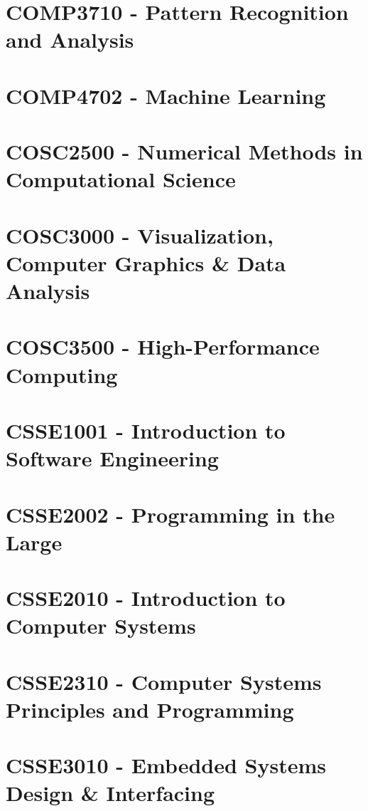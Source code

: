 \documentclass[a4paper,12pt]{report}
\begin{document}
\hypertarget{COMP3710}{\section{COMP3710 - Pattern Recognition and Analysis}}

\hypertarget{COMP4702}{\section{COMP4702 - Machine Learning}}

\hypertarget{COSC2500}{\section{COSC2500 - Numerical Methods in Computational Science}}

\hypertarget{COSC3000}{\section{COSC3000 - Visualization, Computer Graphics \& Data Analysis}}

\hypertarget{COSC3500}{\section{COSC3500 - High-Performance Computing}}

\hypertarget{CSSE1001}{\section{CSSE1001 - Introduction to Software Engineering}}

\hypertarget{CSSE2002}{\section{CSSE2002 - Programming in the Large}}

\hypertarget{CSSE2010}{\section{CSSE2010 - Introduction to Computer Systems}}

\hypertarget{CSSE2310}{\section{CSSE2310 - Computer Systems Principles and Programming}}

\hypertarget{CSSE3010}{\section{CSSE3010 - Embedded Systems Design \& Interfacing}}
\end{document}
